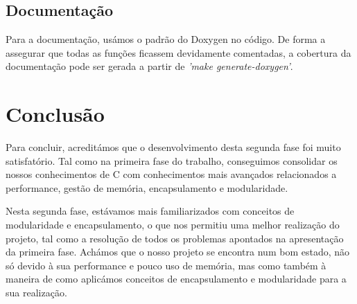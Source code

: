 \documentclass{article}
\begin{document}
            \subsection{Documentação}
                Para a documentação, usámos o padrão do Doxygen no código.
                De forma a assegurar que todas as funções ficassem devidamente comentadas,
                a cobertura da documentação pode ser gerada a partir de \textit{'make generate-doxygen'}.

        \section{Conclusão}
        Para concluir, acreditámos que o desenvolvimento desta segunda fase foi
        muito satisfatório. Tal como na primeira fase do trabalho, conseguimos consolidar 
        os nossos conhecimentos de C com conhecimentos mais avançados relacionados a performance,
        gestão de memória, encapsulamento e modularidade. 

        Nesta segunda fase, estávamos mais familiarizados com conceitos de
        modularidade e encapsulamento, o que nos permitiu uma melhor realização
        do projeto, tal como a resolução de todos os problemas apontados na apresentação da primeira
        fase. Achámos que o nosso projeto se encontra num bom estado, não só devido
        à sua performance e pouco uso de memória, mas como também à maneira de como 
        aplicámos conceitos de encapsulamento e modularidade para a sua realização.
\end{document}
